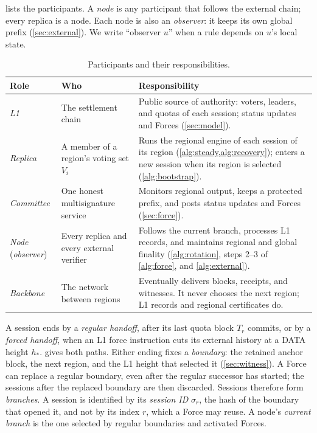 \documentclass[11pt,a4paper]{article}
\newcommand{\defterm}[1]{\textcolor{rrBlue}{\textit{#1}}}
\begin{document}
 lists the participants. A \defterm{node} is any
participant that follows the external chain; every replica is a node.
Each node is also an \defterm{observer}: it keeps its own global prefix
(\cref{sec:external}). We write ``observer $u$'' when a rule depends on
$u$'s local state.

\begin{table}[htbp]\centering\small
\caption{Participants and their responsibilities.}
\label{tab:roles}
\begin{tabularx}{\linewidth}{@{}>{\raggedright\arraybackslash}p{.15\linewidth}>{\raggedright\arraybackslash}p{.25\linewidth}Y@{}}
\toprule
Role & Who & Responsibility\\
\midrule
\defterm{L1} & The settlement chain & Public source of authority:
voters, leaders, and quotas of each session; status updates and Forces
(\cref{sec:model}).\\
\defterm{Replica} & A member of a region's voting set $V_i$ &
Runs the regional engine of each session of its region
(\cref{alg:steady,alg:recovery}); enters a new session when its region
is selected (\cref{alg:bootstrap}).\\
\defterm{Committee} & One honest multisignature service &
Monitors regional output, keeps a protected prefix, and posts status
updates and Forces (\cref{sec:force}).\\
\defterm{Node} (\defterm{observer}) & Every replica and every external verifier &
Follows the current branch, processes L1 records, and maintains
regional and global finality (\cref{alg:rotation}, steps 2--3 of
\cref{alg:force}, and \cref{alg:external}).\\
\defterm{Backbone} & The network between regions & Eventually
delivers blocks, receipts, and witnesses. It never chooses the next
region; L1 records and regional certificates do.\\
\bottomrule
\end{tabularx}
\end{table}

A session ends by a \defterm{regular handoff}, after its last quota block
$T_r$ commits, or by a \defterm{forced handoff}, when an L1 force
instruction cuts its external history at a DATA height $h_*$.
 gives both paths. Either ending fixes a
\defterm{boundary}: the retained anchor block, the next region, and the L1
height that selected it (\cref{sec:witness}). A Force can replace a
regular boundary, even after the regular successor has started; the
sessions after the replaced boundary are then discarded. Sessions
therefore form \defterm{branches}. A session is identified by its
\defterm{session ID} $\sigma_r$, the hash of the boundary that opened it,
and not by its index $r$, which a Force may reuse. A node's
\defterm{current branch} is the one selected by regular boundaries and
activated Forces.
\end{document}
